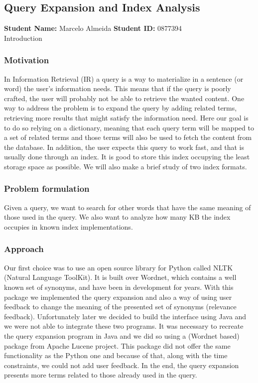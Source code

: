 \subsection{Query Expansion and Index Analysis}
\textbf{Student Name: }Marcelo Almeida \textbf{Student ID:} 0877394 \\
Introduction

\subsubsection*{Motivation}
In Information Retrieval (IR) a query is a way to materialize in a sentence (or word) the user's information needs. This means that if the query is poorly crafted, the user will probably not be able to retrieve the wanted content. One way to address the problem is to expand  the query by adding related terms, retrieving more results that might satisfy the information need. Here our goal is to do so relying on a dictionary, meaning that each query term will be mapped to a set of related terms and those terms will also be used to fetch the content from the database. In addition, the user expects this query to work fast, and that is usually done through an index. It is good to store this index occupying the least storage space as possible. We will also make a brief study of two index formats.

\subsubsection*{Problem formulation}
Given a query, we want to search for other words that have the same meaning of those used in the query. We also want to analyze how many KB the index occupies in known index implementations.


\subsubsection*{Approach}
Our first choice was to use an open source library for Python called NLTK (Natural Language ToolKit). It is built over Wordnet, which contains a well known set of synonyms, and have been in development for years. With this package we implemented the query expansion and also a way of using user feedback to change the meaning of the presented set of synonyms (relevance feedback). Unfortunately later we decided to build the interface using Java and we were not able to integrate these two programs. It was necessary to recreate the query expansion program in Java and we did so using a (Wordnet based) package from Apache Lucene project. This package did not offer the same functionality as the Python one and because of that, along with the time constraints, we could not add user feedback. In the end, the query expansion presents more terms related to those already used in the query.

